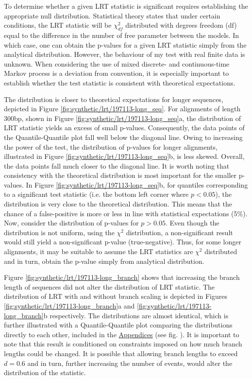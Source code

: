 To determine whether a given LRT statistic is significant requires establishing the appropriate null distribution. Statistical theory states that under certain conditions, the LRT statistic will be $\chi^2_{df}$ distributed with degrees freedom (df) equal to the difference in the number of free parameter between the models. In which case, one can obtain the p-values for a given LRT statistic simply from the analytical distribution. However, the behaviour of my test with real finite data is unknown. When considering the use of mixed discrete- and continuous-time Markov process is a deviation from convention, it is especially important to establish whether the test statistic is consistent with theoretical expectations. 

The distribution is closer to theoretical expectations for longer sequences, depicted in Figure \ref{fig:synthetic/lrt/197113-long_seq}. For alignments of length 300bp, shown in Figure \ref{fig:synthetic/lrt/197113-long_seq}a, the distribution of LRT statistic yields an excess of small p-values. Consequently, the data points of the Quantile-Quantile plot fall well below the diagonal line. Owing to increasing the power of the test, the distribution of p-values for longer alignments, illustrated in Figure \ref{fig:synthetic/lrt/197113-long_seq}b, is less skewed. Overall, the data points fall much closer to the diagonal line. It is worth noting that consistency with the theoretical distribution is most important for the smaller p-values. In Figure \ref{fig:synthetic/lrt/197113-long_seq}b, for quantiles corresponding to a significant test statistic (i.e. the bottom left corner where $p<0.05$), the distribution is very close to the theoretical distribution. This means that the chance of a false-positive is more or less in line with statistical expectations (5\%). Now, consider the distribution of p-values for $p>0.05$. Even though the distribution is not uniform, using the $\chi^{2}$ distribution, a non-significant result would still yield a non-significant p-value (true-negative). Thus, for some longer alignments, it may be suitable to assume the LRT statistics are $\chi^{2}$ distributed and in turn, obtain the p-value simply from analytical distribution. 





Figure \ref{fig:synthetic/lrt/197113-long_branch} shows that increasing the branch length of sequences did not alter the distribution of LRT statistic. The distribution of LRT with and without branch scaling is depicted in Figures \ref{fig:synthetic/lrt/197113-long_branch}a and \ref{fig:synthetic/lrt/197113-long_branch}b respectively. The distributions are almost identical, which is further illustrated with a Quantile-Quantile plot comparing the distributions directly to each other, included in the \hyperref[Appendices]{Appendices} (see fig. ). It is important to note that this result is conditioned on constraints imposed on how much branch lengths could be changed. It is possible that allowing branch lengths to exceed $d=0.6$ and in turn, further increasing the number of events, would alter the distribution of the statistic.


